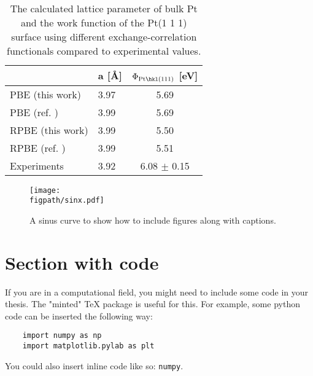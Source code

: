 \begin{table}[!tbh]
\begin{center}
  \begin{tabular}{llc}
  \toprule
       &  a [\AA{}]  &  $\Phi\mathrm{_{Pt\hkl(111)}}$ [eV]  \\
  \midrule
  PBE (this work) &  3.97  &    5.69  \\
  PBE (ref. \cite{Singh-miller2009}) & 3.99  &    5.69   \\
  RPBE (this work) &  3.99 &   5.50 \\
  RPBE (ref. \cite{Sakong2018})&  3.99 &   5.51 \\
  Experiments &  3.92 \cite{Kittel1976} &   6.08 $\pm$ 0.15 \cite{Salmeron1983} \\
  \bottomrule
  \end{tabular}
\end{center}
\caption[Calculated lattice parameter of Pt and work function of the Pt\hkl(1 1 1)
surface.]{The calculated lattice parameter of bulk Pt and the work function of the
Pt\hkl(1 1 1) surface using different exchange-correlation functionals compared to
experimental values.}
\label{main_tab1}
\end{table}

\begin{figure}[!tbh]
\centering
\texttt{[image: \\figpath/sinx.pdf]}
\caption[A sinus curve]{A sinus curve to show how to include figures along with
captions.} %
\label{main_fig1}
\end{figure}

\section{Section with code}
\label{sec_code}

If you are in a computational field, you might need to include some code in your
thesis. The "minted" TeX package is useful for this. For example, some python code
can be inserted the following way:

\begin{verbatim}
    import numpy as np
    import matplotlib.pylab as plt
\end{verbatim}

You could also insert inline code like so: \texttt{numpy}.
